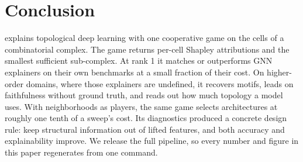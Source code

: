 \section{Conclusion}
\label{sec:conclusion}

\method explains topological deep learning with one cooperative game
on the cells of a combinatorial complex. The game returns per-cell
Shapley attributions and the smallest sufficient sub-complex. At rank
1 it matches or outperforms GNN explainers on their own benchmarks at
a small fraction of their cost. On higher-order domains, where those
explainers are undefined, it recovers motifs, leads on faithfulness
without ground truth, and reads out how much topology a model uses.
With neighborhoods as players, the same game selects architectures at
roughly one tenth of a sweep's cost. Its diagnostics produced a
concrete design rule: keep structural information out of lifted
features, and both accuracy and explainability improve. We release the
full pipeline, so every number and figure in this paper regenerates
from one command.

